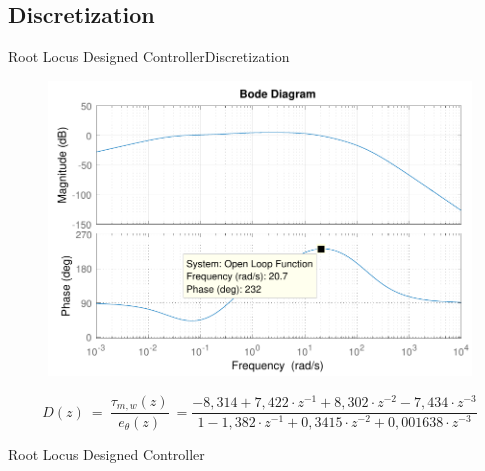 \subsection{Discretization}
\begin{frame}{Root Locus Designed Controller}{Discretization}
	
\begin{figure}
	\includegraphics[scale=.435]{Pictures/bodeOL}
\end{figure}
	
\begin{displaymath}
	D(z)\ =\ \frac{\tau_{m,w}(z)}{e_{\theta}(z)}\  = \frac{-8,314 + 7,422 \cdot z^{-1} + 8,302 \cdot z^{-2} - 7,434 \cdot z^{-3}}{1 - 1,382 \cdot z^{-1} + 0,3415 \cdot z^{-2} + 0,001638 \cdot z^{-3}}  \nonumber 
\end{displaymath}
\end{frame}

\begin{frame}{Root Locus Designed Controller}{}	
\begin{figure}
	
\end{figure}
\end{frame}
